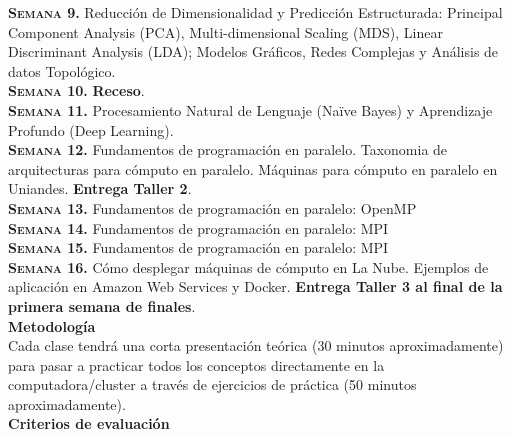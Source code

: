 \documentclass[letterpaper,10pt,onecolumn]{article}
\begin{document}
\noindent\textbf{\textsc{Semana 9.}} 
Reducción de Dimensionalidad y Predicción Estructurada: Principal
Component Analysis (PCA), Multi-dimensional Scaling (MDS), Linear
Discriminant Analysis (LDA); Modelos Gráficos, Redes Complejas y
Análisis de datos Topológico.   
\\[-0.3cm] 

\noindent\textbf{\textsc{Semana 10.}}  
{\bf Receso}.
\\[-0.3cm] 

\noindent\textbf{\textsc{Semana 11.}}  
Procesamiento Natural de Lenguaje (Naïve Bayes) y Aprendizaje Profundo
(Deep Learning). 
\\[-0.3cm] 

\noindent\textbf{\textsc{Semana 12.}}  
Fundamentos de programaci\'on en paralelo. Taxonomia de arquitecturas
para c\'omputo en paralelo. M\'aquinas para c\'omputo en paralelo en
Uniandes. {\bf Entrega Taller 2}.
\\[-0.3cm]  

\noindent\textbf{\textsc{Semana 13.}} 
Fundamentos de programaci\'on en paralelo: OpenMP
\\[-0.3cm]  

\noindent\textbf{\textsc{Semana 14.}} 
Fundamentos de programaci\'on en paralelo: MPI
\\[-0.3cm] 

\noindent\textbf{\textsc{Semana 15.}} 
Fundamentos de programaci\'on en paralelo: MPI
\\[-0.3cm] 

\noindent\textbf{\textsc{Semana 16.}} 
C\'omo desplegar m\'aquinas de c\'omputo en La Nube. Ejemplos de
aplicaci\'on en Amazon Web Services y Docker.  {\bf Entrega Taller 3 al final de la primera semana de finales}.
\\[-0.1cm]  


\noindent\textbf{\large {} \quad
  Metodolog\'ia}\\[-0.2cm] 


\noindent\normalsize Cada clase tendr\'a una corta presentaci\'on
te\'orica (30 minutos aproximadamente) para pasar a practicar todos
los conceptos directamente en la computadora/cluster a trav\'es de
ejercicios de pr\'actica (50 minutos aproximadamente). \\[0.1cm]


\noindent\textbf{\large {} \quad Criterios de
  evaluaci\'on}\\[-0.2cm] 
\end{document}
